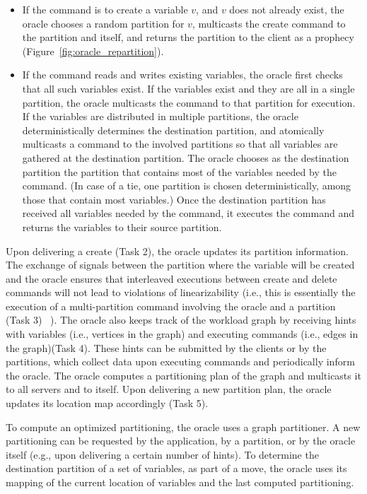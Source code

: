 \begin{itemize}
\item If the command is to create a variable $v$, and $v$ does not already
exist, the oracle chooses a random partition for $v$, multicasts the create
command to the partition and itself, and returns the partition to the client as
a prophecy (Figure~\ref{fig:oracle_repartition}).
\item If the command reads and writes existing variables, the oracle first
checks that all such variables exist. If the variables exist and they are all in
a single partition, the oracle multicasts the command to that partition for
execution. If the variables are distributed in multiple partitions, the oracle
deterministically determines the destination partition, and atomically
multicasts a command to the involved partitions so that all variables are
gathered at the destination partition. The oracle chooses as the destination
partition the partition that contains most of the variables needed by the
command. (In case of a tie, one partition is chosen deterministically, among
those that contain most variables.) Once the destination partition has received
all variables needed by the command, it executes the command and returns the
variables to their source partition.
\end{itemize}


Upon delivering a create (Task 2), the oracle updates its partition information.
The exchange of signals between the partition where the variable will be created
and the oracle ensures that interleaved executions between create and delete
commands will not lead to violations of linearizability (i.e., this is
essentially the execution of a multi-partition command involving the oracle and
a partition (Task 3) ~\cite{bezerra2014ssmr}). The oracle also keeps track of
the workload graph by receiving hints with variables (i.e., vertices in the
graph) and executing commands (i.e., edges in the graph)(Task 4). These hints can be
submitted by the clients or by the partitions, which collect data upon executing
commands and periodically inform the oracle. The oracle computes a
partitioning plan of the graph and multicasts it to all servers and to itself.
Upon delivering a new partition plan, the oracle updates its location map
accordingly (Task 5).

To compute an optimized partitioning, the oracle uses a graph partitioner. A new
partitioning can be requested by the application, by a partition, or by the
oracle itself (e.g., upon delivering a certain number of hints). To determine
the destination partition of a set of variables, as part of a move, the oracle
uses its mapping of the current location of variables and the last computed
partitioning.

